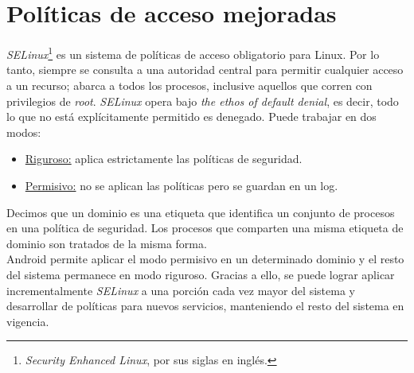 \section{Políticas de acceso mejoradas}
\emph{SELinux}\footnote{\textit{Security Enhanced Linux}, por sus siglas en inglés.} es un sistema de políticas de acceso obligatorio para Linux. Por lo tanto, siempre se consulta a una autoridad central para permitir cualquier acceso a un recurso; abarca a todos los procesos, inclusive aquellos que corren con privilegios de \textit{root}. \emph{SELinux} opera bajo \textit{the ethos of default denial}, es decir, todo lo que no está explícitamente permitido es denegado. Puede trabajar en dos modos:
\begin{itemize}
    \item \underline{Riguroso:} aplica estrictamente las políticas de seguridad.
    \item \underline{Permisivo:} no se aplican las políticas pero se guardan en un log.
\end{itemize} 
Decimos que un dominio es una etiqueta que identifica un conjunto de procesos en una política de seguridad. Los procesos que comparten una misma etiqueta de dominio son tratados de la misma forma. \\
Android permite aplicar el modo permisivo en un determinado dominio y el resto del sistema permanece en modo riguroso. Gracias a ello, se puede lograr aplicar incrementalmente \emph{SELinux} a una porción cada vez mayor del sistema y desarrollar de políticas para nuevos servicios, manteniendo el resto del sistema en vigencia.
